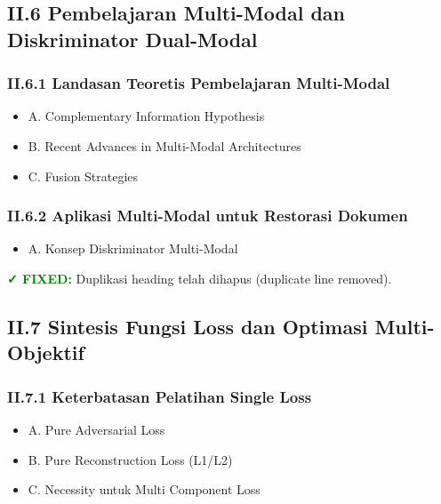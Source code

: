 \documentclass[11pt,a4paper]{article}
\begin{document}
\vspace{0.5em}

\subsection*{II.6 Pembelajaran Multi-Modal dan Diskriminator Dual-Modal}

\subsubsection*{II.6.1 Landasan Teoretis Pembelajaran Multi-Modal}
\begin{itemize}[label={}, leftmargin=2em]
    \item A. Complementary Information Hypothesis
    \item B. Recent Advances in Multi-Modal Architectures
    \item C. Fusion Strategies
\end{itemize}

\subsubsection*{II.6.2 Aplikasi Multi-Modal untuk Restorasi Dokumen}
\begin{itemize}[label={}, leftmargin=2em]
    \item A. Konsep Diskriminator Multi-Modal
\end{itemize}

\textcolor{green}{\textbf{✓ FIXED:}} Duplikasi heading telah dihapus (duplicate line removed).

\vspace{0.5em}

\subsection*{II.7 Sintesis Fungsi Loss dan Optimasi Multi-Objektif}

\subsubsection*{II.7.1 Keterbatasan Pelatihan Single Loss}
\begin{itemize}[label={}, leftmargin=2em]
    \item A. Pure Adversarial Loss
    \item B. Pure Reconstruction Loss (L1/L2)
    \item C. Necessity untuk Multi Component Loss
\end{itemize}
\end{document}
